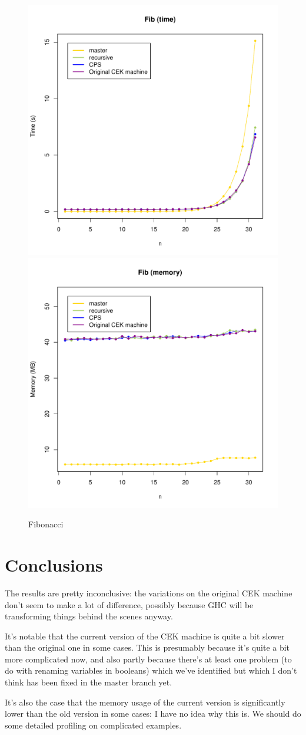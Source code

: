 \documentclass[a4paper]{article}
\begin{document}
\newpage
\begin{figure}[H]
\centering
\includegraphics[width=0.8\linewidth]{fib-times.pdf}
\includegraphics[width=0.8\linewidth]{fib-mem.pdf}
\caption{Fibonacci}\label{fig:fib-graphs}
\end{figure}

\newpage
\section*{Conclusions}
The results are pretty inconclusive: the variations on the original
CEK machine don't seem to make a lot of difference, possibly because
GHC will be transforming things behind the scenes anyway.

It's notable that the current version of the CEK machine is quite a
bit slower than the original one in some cases.  This is presumably
because it's quite a bit more complicated now, and also partly because
there's at least one problem (to do with renaming variables in
booleans) which we've identified but which I don't think has been
fixed in the master branch yet.

It's also the case that the memory usage of the current version is
significantly lower than the old version in some cases: I have no idea
why this is.  We should do some detailed profiling on complicated
examples.
\end{document}
